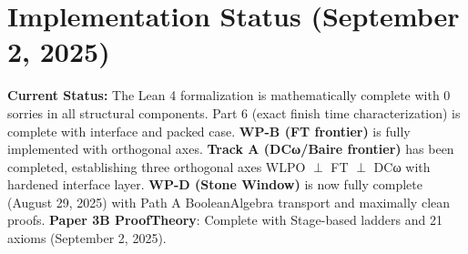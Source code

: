 \documentclass[11pt]{article}
\theoremstyle{definition}
\theoremstyle{remark}
\begin{document}
\section{Implementation Status (September 2, 2025)}

\begin{mdframed}[style=status]
\textbf{Current Status:} The Lean 4 formalization is mathematically complete with 0 sorries in all structural components. Part 6 (exact finish time characterization) is complete with interface and packed case. \textbf{WP-B (FT frontier)} is fully implemented with orthogonal axes. \textbf{Track A (DCω/Baire frontier)} has been completed, establishing three orthogonal axes WLPO $\perp$ FT $\perp$ DCω with hardened interface layer. \textbf{WP-D (Stone Window)} is now fully complete (August 29, 2025) with Path A BooleanAlgebra transport and maximally clean proofs. \textbf{Paper 3B ProofTheory}: Complete with Stage-based ladders and 21 axioms (September 2, 2025).
\end{mdframed}
\end{document}
